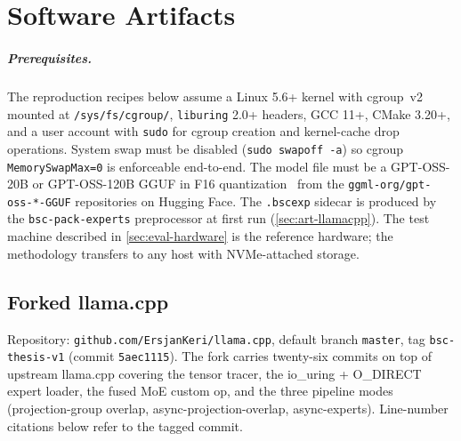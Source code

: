 \chapter{Software Artifacts}\label{chapter:artifacts}

\paragraph{Prerequisites.} The reproduction recipes below assume a Linux 5.6+ kernel with cgroup~v2~\cite{cgroupv2} mounted at \texttt{/sys/fs/cgroup/}, \texttt{liburing} 2.0+ headers, GCC 11+, CMake 3.20+, and a user account with \texttt{sudo} for cgroup creation and kernel-cache drop operations. System swap must be disabled (\texttt{sudo swapoff -a}) so cgroup \texttt{MemorySwapMax=0} is enforceable end-to-end. The model file must be a GPT-OSS-20B or GPT-OSS-120B GGUF in F16 quantization~\cite{openai2025gptoss} from the \texttt{ggml-org/gpt-oss-*-GGUF} repositories on Hugging Face. The \texttt{.bscexp} sidecar is produced by the \texttt{bsc-pack-experts} preprocessor at first run (\autoref{sec:art-llamacpp}). The test machine described in \autoref{sec:eval-hardware} is the reference hardware; the methodology transfers to any host with NVMe-attached storage.


\section{Forked llama.cpp}\label{sec:art-llamacpp}

Repository: \texttt{github.com/ErsjanKeri/llama.cpp}, default branch \texttt{master}, tag \texttt{bsc-thesis-v1} (commit \texttt{5aec1115}). The fork carries twenty-six commits on top of upstream llama.cpp \cite{ggerganov2023llamacpp} covering the tensor tracer, the io\_uring + O\_DIRECT expert loader, the fused MoE custom op, and the three pipeline modes (projection-group overlap, async-projection-overlap, async-experts). Line-number citations below refer to the tagged commit.

